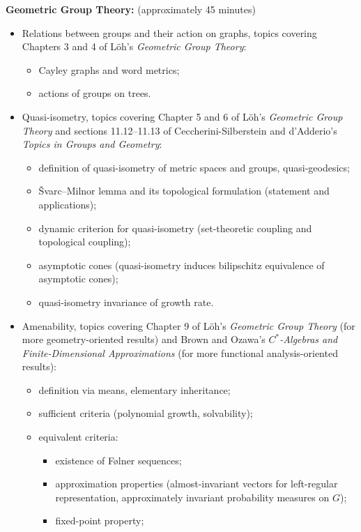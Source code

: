 \documentclass[10pt]{mypackage}
\begin{document}
\textbf{Geometric Group Theory:} (approximately 45 minutes)
\begin{itemize}
  \item Relations between groups and their action on graphs, topics covering Chapters 3 and 4 of Löh's \textit{Geometric Group Theory}:
    \begin{itemize}
      \item Cayley graphs and word metrics;
      \item actions of groups on trees.
    \end{itemize}
  \item Quasi-isometry, topics covering Chapter 5 and 6 of Löh's \textit{Geometric Group Theory} and sections 11.12--11.13 of Ceccherini-Silberstein and d'Adderio's \textit{Topics in Groups and Geometry}:
    \begin{itemize}
      \item definition of quasi-isometry of metric spaces and groups, quasi-geodesics;
      \item \v{S}varc--Milnor lemma and its topological formulation (statement and applications);
      \item dynamic criterion for quasi-isometry (set-theoretic coupling and topological coupling);
      \item asymptotic cones (quasi-isometry induces bilipschitz equivalence of asymptotic cones);
      \item quasi-isometry invariance of growth rate.
    \end{itemize}
  \item Amenability, topics covering Chapter 9 of Löh's \textit{Geometric Group Theory} (for more geometry-oriented results) and Brown and Ozawa's \textit{$C^{\ast}$-Algebras and Finite-Dimensional Approximations} (for more functional analysis-oriented results):
    \begin{itemize}
      \item definition via means, elementary inheritance;
      \item sufficient criteria (polynomial growth, solvability);
      \item equivalent criteria:
      \begin{itemize}
        \item existence of Følner sequences;
        \item approximation properties (almost-invariant vectors for left-regular representation, approximately invariant probability measures on $G$);
        \item fixed-point property;

\end{itemize}
\end{itemize}
\end{itemize}
\end{document}
